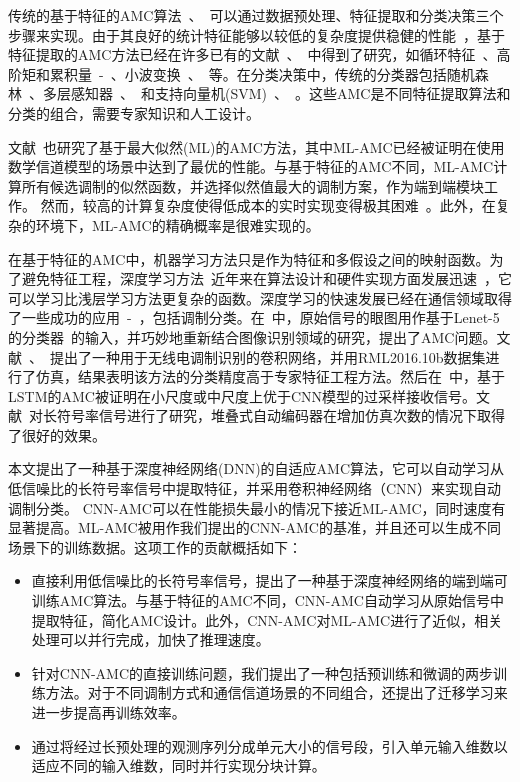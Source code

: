 \documentclass[final]{cvpr}
\begin{document}
传统的基于特征的AMC算法~\cite{r3}、~\cite{r4}可以通过数据预处理、特征提取和分类决策三个步骤来实现。由于其良好的统计特征能够以较低的复杂度提供稳健的性能~\cite{r5}，基于特征提取的AMC方法已经在许多已有的文献~\cite{r6}、~\cite{r7}中得到了研究，如循环特征~\cite{r8}、高阶矩和累积量~\cite{r9}-~\cite{r11}、小波变换~\cite{r12}、~\cite{r13}等。在分类决策中，传统的分类器包括随机森林~\cite{r14}、多层感知器~\cite{r15}、~\cite{r16}和支持向量机(SVM)~\cite{r17}、~\cite{r18}。这些AMC是不同特征提取算法和分类的组合，需要专家知识和人工设计。

文献~\cite{r19}也研究了基于最大似然(ML)的AMC方法，其中ML-AMC已经被证明在使用数学信道模型的场景中达到了最优的性能。与基于特征的AMC不同，ML-AMC计算所有候选调制的似然函数，并选择似然值最大的调制方案，作为端到端模块工作。
然而，较高的计算复杂度使得低成本的实时实现变得极其困难~\cite{r20}。此外，在复杂的环境下，ML-AMC的精确概率是很难实现的。

在基于特征的AMC中，机器学习方法只是作为特征和多假设之间的映射函数。为了避免特征工程，深度学习方法~\cite{r21}近年来在算法设计和硬件实现方面发展迅速~\cite{r22}，它可以学习比浅层学习方法更复杂的函数。深度学习的快速发展已经在通信领域取得了一些成功的应用~\cite{r23}-~\cite{r25}，包括调制分类。在~\cite{r26}中，原始信号的眼图用作基于Lenet-5的分类器~\cite{r27}的输入，并巧妙地重新结合图像识别领域的研究，提出了AMC问题。文献~\cite{r28}、~\cite{r29}提出了一种用于无线电调制识别的卷积网络，并用RML2016.10b数据集进行了仿真，结果表明该方法的分类精度高于专家特征工程方法。然后在~\cite{r30}中，基于LSTM的AMC被证明在小尺度或中尺度上优于CNN模型的过采样接收信号。文献~\cite{r31}对长符号率信号进行了研究，堆叠式自动编码器在增加仿真次数的情况下取得了很好的效果。

本文提出了一种基于深度神经网络(DNN)的自适应AMC算法，它可以自动学习从低信噪比的长符号率信号中提取特征，并采用卷积神经网络（CNN）来实现自动调制分类。
CNN-AMC可以在性能损失最小的情况下接近ML-AMC，同时速度有显著提高。ML-AMC被用作我们提出的CNN-AMC的基准，并且还可以生成不同场景下的训练数据。这项工作的贡献概括如下：
\begin{itemize}
\item 直接利用低信噪比的长符号率信号，提出了一种基于深度神经网络的端到端可训练AMC算法。与基于特征的AMC不同，CNN-AMC自动学习从原始信号中提取特征，简化AMC设计。此外，CNN-AMC对ML-AMC进行了近似，相关处理可以并行完成，加快了推理速度。
\item  针对CNN-AMC的直接训练问题，我们提出了一种包括预训练和微调的两步训练方法。对于不同调制方式和通信信道场景的不同组合，还提出了迁移学习来进一步提高再训练效率。
\item  通过将经过长预处理的观测序列分成单元大小的信号段，引入单元输入维数以适应不同的输入维数，同时并行实现分块计算。 
\end{itemize}
\end{document}

